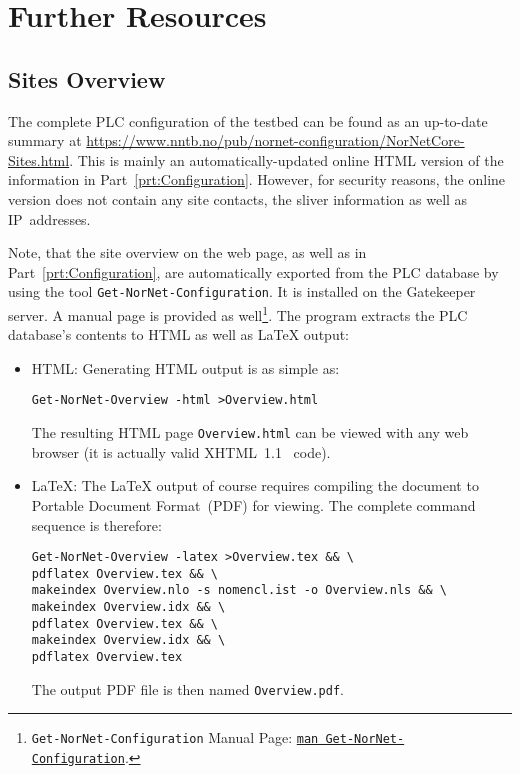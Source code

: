 \section{Further Resources}

\subsection{Sites Overview}

The complete PLC configuration of the  testbed can be found as an up-to-date summary at \url{https://www.nntb.no/pub/nornet-configuration/NorNetCore-Sites.html}. This is mainly an automatically-updated online HTML version of the information in Part~\ref{prt:Configuration}. However, for security reasons, the online version does not contain any site contacts, the sliver information as well as IP~addresses.

Note, that the site overview on the web page, as well as in Part~\ref{prt:Configuration}, are automatically exported from the PLC database by using the tool \texttt{Get-NorNet-Configuration}. It is installed on the Gatekeeper server. A manual page is provided as well\footnote{\texttt{Get-NorNet-Configuration} Manual Page: \texttt{\href{man:Get-NorNet-Configuration}{man Get-NorNet-Configuration}}.}. The program extracts the PLC database's contents to HTML as well as \LaTeX\index{\LaTeX} output:
\begin{itemize}
 \item HTML: Generating HTML output is as simple as:
\begin{lstlisting}
Get-NorNet-Overview -html >Overview.html
\end{lstlisting}
The resulting HTML page \texttt{Overview.html} can be viewed with any web browser (it is actually valid XHTML~1.1~\cite{recommendation-W3C-XHTML1.1} code).

 \item \LaTeX: The \LaTeX{} output of course requires compiling the document to Portable Document Format~(PDF) for viewing. The complete command sequence is therefore:
\begin{lstlisting}
Get-NorNet-Overview -latex >Overview.tex && \
pdflatex Overview.tex && \
makeindex Overview.nlo -s nomencl.ist -o Overview.nls && \
makeindex Overview.idx && \
pdflatex Overview.tex && \
makeindex Overview.idx && \
pdflatex Overview.tex 
\end{lstlisting}
The output PDF file is then named \texttt{Overview.pdf}.

\end{itemize}



